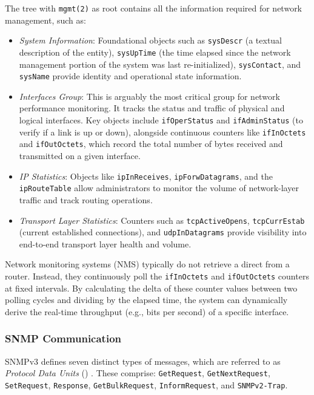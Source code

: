 The tree with \texttt{mgmt(2)} as root contains all the information required for network management, such as:
\begin{itemize}
    \item \emph{System Information}: Foundational objects such as \texttt{sysDescr} (a textual description of the entity), \texttt{sysUpTime} (the time elapsed since the network management portion of the system was last re-initialized), \texttt{sysContact}, and \texttt{sysName} provide identity and operational state information.
    \item \emph{Interfaces Group}: This is arguably the most critical group for network performance monitoring. It tracks the status and traffic of physical and logical interfaces. Key objects include \texttt{ifOperStatus} and \texttt{ifAdminStatus} (to verify if a link is up or down), alongside continuous counters like \texttt{ifInOctets} and \texttt{ifOutOctets}, which record the total number of bytes received and transmitted on a given interface.
    \item \emph{IP Statistics}: Objects like \texttt{ipInReceives}, \texttt{ipForwDatagrams}, and the \texttt{ipRouteTable} allow administrators to monitor the volume of network-layer traffic and track routing operations.
    \item \emph{Transport Layer Statistics}: Counters such as \texttt{tcpActiveOpens}, \texttt{tcpCurrEstab} (current established connections), and \texttt{udpInDatagrams} provide visibility into end-to-end transport layer health and volume.
\end{itemize}

Network monitoring systems (NMS) typically do not retrieve a direct  from a router. Instead, they continuously poll the \texttt{ifInOctets} and \texttt{ifOutOctets} counters at fixed intervals. 
By calculating the delta of these counter values between two polling cycles and dividing by the elapsed time, the system can dynamically derive the real-time throughput (e.g., bits per second) of a specific interface.

\subsubsection{SNMP Communication}
SNMPv3 defines seven distinct types of messages, which are referred to as \emph{Protocol Data Units} () \cite{rfc3416}.
These comprise: \texttt{GetRequest}, \texttt{GetNextRequest}, \texttt{SetRequest}, \texttt{Response}, \texttt{GetBulkRequest}, \texttt{InformRequest}, and \texttt{SNMPv2-Trap}.


